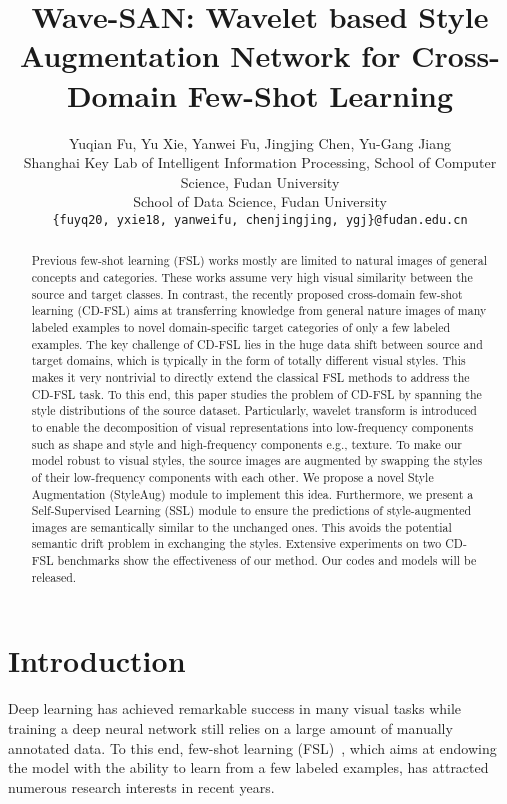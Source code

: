 \documentclass{article}
\title{Wave-SAN: Wavelet based Style Augmentation Network for Cross-Domain Few-Shot Learning}
\author{Yuqian Fu, Yu Xie, Yanwei Fu, Jingjing Chen, Yu-Gang Jiang 
\\Shanghai Key Lab of Intelligent Information Processing, School of Computer Science, Fudan University
\\School of Data Science, Fudan University
\\ \texttt{\{fuyq20, yxie18, yanweifu, chenjingjing, ygj\}@fudan.edu.cn}
}
\begin{document}
\maketitle


\begin{abstract}
 Previous few-shot learning (FSL) works mostly are limited to natural images of general concepts and categories. These works assume very high visual similarity between the source and target classes. In contrast, the recently proposed cross-domain few-shot learning (CD-FSL) aims at transferring knowledge from general nature images of many labeled examples to novel domain-specific target categories of only a few labeled examples. The key challenge of CD-FSL lies in the huge data shift between source and target domains, which is typically in the form of totally different visual styles. This makes it very nontrivial to directly extend the classical FSL methods to address the CD-FSL task. To this end, this paper studies the problem of CD-FSL by spanning the style distributions of the source dataset. Particularly, wavelet transform is introduced to enable the decomposition of visual representations into low-frequency components such as shape and style and high-frequency components e.g., texture. To make our model robust to visual styles, the source images are augmented by swapping the styles of their low-frequency components with each other. We propose a novel Style Augmentation (StyleAug) module to implement this idea. Furthermore, we present a Self-Supervised Learning (SSL) module to ensure the predictions of style-augmented images are semantically similar to the unchanged ones. This avoids the potential semantic drift problem in exchanging the styles. Extensive experiments on two CD-FSL benchmarks show the effectiveness of our method. Our codes and models will be released.
\end{abstract}




\section{Introduction}\label{sec:intro}

Deep learning has achieved remarkable success in many visual tasks while training a deep neural network still relies on a large amount of manually annotated data. To this end, few-shot learning (FSL)~\cite{snell2017prototypical,vinyals2016matching,sung2018learning,garcia2017few,li2020adversarial}, which aims at endowing the model with the ability to learn from a few labeled examples, has attracted numerous research interests in recent years.
\end{document}
